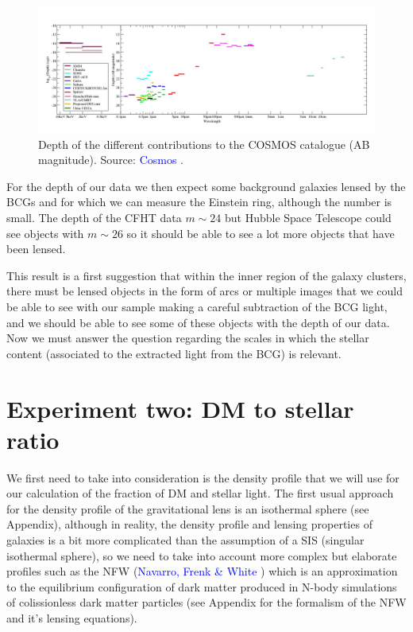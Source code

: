 \begin{figure}[H]
\centering
\includegraphics[width=15cm]{images/cosmos_depth-updated.jpg}
\caption[Depth of the different contributions to the COSMOS catalogue]{Depth of the different contributions to the COSMOS catalogue (AB magnitude). Source: \textcolor{blue}{Cosmos} \citeyear{Reference35}.}
\end{figure}

For the depth of our data we then expect some background galaxies lensed by the BCGs and for which we can measure the Einstein ring, although the number is small. The depth of the CFHT data $m\sim 24$ but Hubble Space Telescope could see objects with $m\sim 26$ so it should be able to see a lot more objects that have been lensed. 

This result is a first suggestion that within the inner region of the galaxy clusters, there must be lensed objects in the form of arcs or multiple images that we could be able to see with our sample making a careful subtraction of the BCG light, and we should be able to see some of these objects with the depth of our data. Now we must answer the question regarding the scales in which the stellar content (associated to the extracted light from the BCG) is relevant.

\section{Experiment two: DM to stellar ratio}

We first need to take into consideration is the density profile that we will use for our calculation of the fraction of DM and stellar light. The first usual approach for the density profile of the gravitational lens is an isothermal sphere (see Appendix), although in reality, the density profile and lensing properties of galaxies is a bit more complicated than the assumption of a SIS (singular isothermal sphere), so we need to take into account more complex but elaborate profiles such as the NFW (\textcolor{blue}{Navarro, Frenk \& White} \citeyear{Reference17}) which is an approximation to the equilibrium configuration of dark matter produced in N-body simulations of colissionless dark matter particles (see Appendix for the formalism of the NFW and it's lensing equations).


